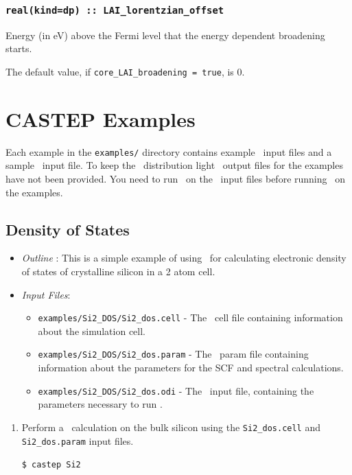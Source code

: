 \documentclass[a4paper,11pt,twoside]{book}
\begin{document}
{\subsection[core\_lorentzian\_offset]{\tt real(kind=dp) :: LAI\_lorentzian\_offset}
Energy (in eV) above the Fermi level that the energy dependent broadening starts.

The default value, if \verb#core_LAI_broadening = true#, is 0.


\chapter{CASTEP Examples}

Each example in the \verb#examples/# directory contains example \castep\ input files and a sample \optados\ input file. To keep the \optados\ distribution light \castep\ output files for the examples have not been provided. You need to run \castep\ on the \castep\ input files before running \optados\ on the examples.

\section{Density of States}
\begin{itemize}
\item \emph{Outline} : This is a simple example of using \optados\ for calculating electronic density of states of crystalline silicon in a 2 atom cell.
\item \emph{Input Files}:
\begin{itemize}
\item \verb#examples/Si2_DOS/Si2_dos.cell# - The \castep\ cell file containing information about the simulation cell.
\item \verb#examples/Si2_DOS/Si2_dos.param# - The \castep\ param file containing information about the parameters for the SCF and spectral calculations.
\item \verb#examples/Si2_DOS/Si2_dos.odi# - The \optados\ input file, containing the parameters necessary to run \optados.
\end{itemize}
\end{itemize}

\begin{enumerate}
\item Perform a \castep\ calculation on the bulk silicon using the  \verb#Si2_dos.cell#  and \verb#Si2_dos.param# input files.

  \verb#$ castep Si2#


\end{enumerate}}
\end{document}
